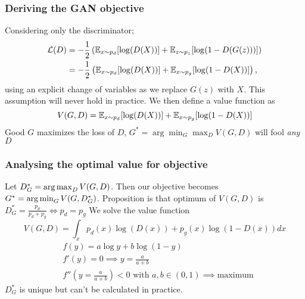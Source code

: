 \documentclass[12pt]{article}
\begin{document}
\subsubsection{Deriving the GAN objective}
\par Considering only the discriminator;
\begin{equation*}
\begin{split}
\mathcal{L} (D) & = -\frac{1}{2} \left( \operatorname{\mathbb{E}}_{x\sim p_d}[\log (D(X))] + \operatorname{\mathbb{E}}_{z\sim p_z}[\log (1 - D(G(z)))] \right) \\
& = -\frac{1}{2} \left( \operatorname{\mathbb{E}}_{x\sim p_d}[\log (D(X))] + \operatorname{\mathbb{E}}_{x\sim p_g}[\log (1 - D(X))] \right) \text{,}
\end{split}
\end{equation*}
using an explicit change of variables as we replace $G(z)$ with $X$. This assumption will never hold in practice.
We then define a value function as
\[ V(G,D) = \operatorname{\mathbb{E}}_{x\sim p_d}[\log (D(X))] + \operatorname{\mathbb{E}}_{x\sim p_g}[\log (1 - D(X))] \]
Good $G$ maximizes the loss of $D$, $G^* = \arg\min_{G}\max_{D} V(G,D) $ will fool \textit{any} $D$

\subsubsection{Analysing the optimal value for objective}
Let $D^*_G = \operatorname*{arg\,max}_D V(G,D)$. Then our objective becomes $G^* = \operatorname*{arg\,min}_G V(G, D^*_G)$. Proposition is that optimum of $V(G,D)$ is $D^*_G = \frac{p_d}{p_d + p_g} \iff p_d = p_g$
We solve the value function
\[ V(G,D) = \int_x p_d(x)\log (D(x)) + p_g(x) \log(1-D(x)) dx \]
\begin{equation*}
\begin{split}
& f(y) = a\log y + b\log (1-y) \\
& f'(y) = 0 \implies y = \frac{a}{a+b} \\
& f''(y = \frac{a}{a+b}) < 0 \text{ with } a,b\in (0,1) \implies \text{maximum}
\end{split}
\end{equation*}
$D^*_G$ is unique but can't be calculated in practice.
\end{document}
